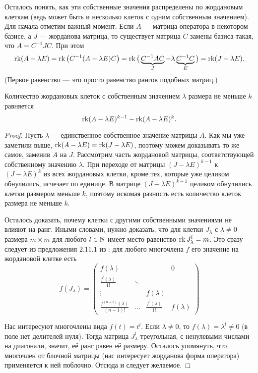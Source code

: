 Осталось понять, как эти собственные значения распределены по жордановым клеткам (ведь может быть и несколько клеток с одним собственным значением). Для начала отметим важный момент. Если $A$ --- матрица оператора в некотором базисе, а $J$ --- жорданова матрица, то существует матрица $C$ замены базиса такая, что $A = C^{-1}JC$. При этом
\[
	\operatorname{rk}(A - \lambda E) = \operatorname{rk}\big(C^{-1}(A - \lambda E)C\big) = \operatorname{rk}\big(\underbrace{C^{-1}AC}_{J} - \lambda\underbrace{C^{-1}C}_{E}\big) = \operatorname{rk}(J - \lambda E).
\]
(Первое равенство --- это просто равенство рангов подобных матриц.)

\begin{lemma}
	Количество жордановых клеток с собственным значением $\lambda$ размера не меньше $k$ равняется
	\[
		\operatorname{rk}(A - \lambda E)^{k - 1} - \operatorname{rk}(A - \lambda E)^k.
	\]
\end{lemma}

\begin{proof}
	Пусть $\lambda$ --- единственное собственное значение матрицы $A$. Как мы уже заметили выше, $\operatorname{rk}(A - \lambda E) = \operatorname{rk}(J - \lambda E)$, поэтому можем доказывать то же самое, заменив $A$ на $J$. Рассмотрим часть жордановой матрицы, соответствующей собственному значению $\lambda$. При переходе от матрицы $(J - \lambda E)^{k - 1}$ к $(J - \lambda E)^k$ из всех жордановых клетки, кроме тех, которые уже целиком обнулились, исчезает по единице. В матрице $(J - \lambda E)^{k - 1}$ целиком обнулились клетки размером меньше $k$, поэтому искомая разность есть количество клеток размера не меньше $k$.

	Осталось доказать, почему клетки с другими собственными значениями не влияют на ранг. Иными словами, нужно доказать, что для клетки $J_\lambda$ с $\lambda \ne 0$ размера $m \times m$ для любого $l \in \mathbb{N}$ имеет место равенство $\operatorname{rk} J_\lambda^l = m$. Это сразу следует из предложения $2{.}11{.}1$ из \cite{P24}: для любого многочлена $f$ его значение на жордановой клетке есть
	\[
		f(J_\lambda) =
		\begin{pmatrix}
			f(\lambda) & & & 0\\
			\frac{f^\prime(\lambda)}{1!} & \ddots & & \\
			\vdots & & f(\lambda) & \\
			\frac{f^{(n - 1)}(\lambda)}{(n - 1)!} & \ldots & \frac{f^\prime(\lambda)}{1!} & f(\lambda)
		\end{pmatrix}
	\]

	Нас интересуют многочлены вида $f(t) = t^l$. Если $\lambda \ne 0$, то $f(\lambda) = \lambda^l \ne 0$ (в поле нет делителей нуля). Тогда матрица $J_\lambda^l$ треугольная, с ненулевыми числами на диагонали, значит, её ранг равен её размеру. Осталось упомянуть, что многочлен от блочной матрицы (нас интересует жорданова форма оператора) применяется к ней поблочно. Отсюда и следует желаемое.
\end{proof}

